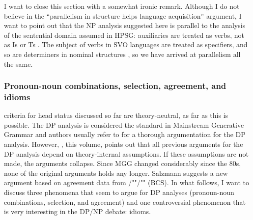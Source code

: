 \documentclass[output=paper
  ,nobabel
  ,draftmode
  ,uniformtopskip %
  ,colorlinks, citecolor=brown
]{langscibook}
\begin{document}
I want to close this section with a somewhat ironic remark. Although I do not believe in the
``parallelism in structure helps language acquisition'' argument, I want to point out that the NP
analysis suggested here is parallel to the analysis of the sentential domain assumed in HPSG:
auxiliaries are treated as verbs, not as Is or Ts \citep{Sag2020a}. The subject of verbs in SVO languages are treated
as specifiers, and so are determiners in nominal structures \citep[Sections~4.3--4.4]{MuellerGermanic},
so we have arrived at parallelism all the same.


\subsubsection{Pronoun-noun combinations, selection, agreement, and idioms}

 criteria for head status discussed so far are theory-neutral, as far as this is
possible. The DP analysis is considered the standard in Mainstream Generative Grammar and authors
usually refer to  for a thorough argumentation for the DP analysis. However,
\citet{chapters/salzmann}, this volume, points out that all previous arguments for the DP analysis depend on theory-internal
assumptions. If these assumptions are not made, the arguments collapse. Since MGG changed
considerably since the 80s, none of the original arguments holds any longer. Salzmann suggests a new
argument based on agreement data from /""/"" (BCS). In what follows, I want to discuss
three phenomena that seem to argue for DP analyses (pronoun-noun combinations, selection, and agreement) and one
controversial phenomenon that is very interesting in the DP/NP debate: idioms.

\label{sec-pronoun-noun-combinations}
\end{document}

